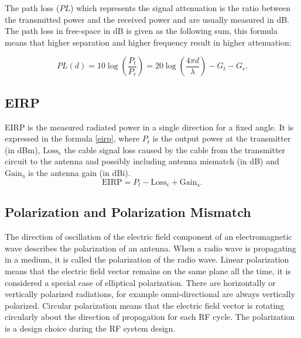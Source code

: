 The path loss ($PL$) which represents the signal attenuation is the ratio between the transmitted power and the received power and are usually measured in dB. The path loss in free-space in dB is given as the following sum, this formula means that higher separation and higher frequency result in higher attenuation:

\begin{equation} 
PL \left( d \right) =10\log(\frac{P_{t}}{P_{r}})  =20\log \left( \frac{4 \pi d}{ \lambda } \right) -G_{t}-G_{r}.
\end{equation}

\subsection{\acf{EIRP}}
\acs{EIRP} is the measured radiated power in a single direction for a fixed angle. It is expressed in the formula \ref{eirp}, where $P_{t}$ is the output power at the transmitter (in dBm), $\mbox{Loss}_{\mbox{c}}$ the cable signal loss caused by the cable from the transmitter circuit to the antenna and possibly including antenna mismatch (in dB) and $\mbox{Gain}_{\mbox{a}}$ is the antenna gain (in dBi).
\begin{equation}
\mbox{EIRP} =  P_{t} - \mbox{Loss}_{\mbox{c}}+  \mbox{Gain}_{\mbox{a}}. \label{eirp}
\end{equation}
  
  


\subsection{Polarization and Polarization Mismatch} \label{sec:pol}
The direction of oscillation of the electric field component of an electromagnetic wave describes the polarization of an antenna. When a radio wave is propagating in a medium, it is called the polarization of the radio wave. Linear polarization means that the electric field vector remains on the same plane all the time, it is considered a special case of elliptical polarization. There are horizontally or vertically polarized radiations, for example omni-directional are always vertically polarized. Circular polarization means that the electric field vector is rotating circularly about the direction of propagation for each \acs{RF} cycle. The polarization is a design choice during the \acs{RF} system design. \\

